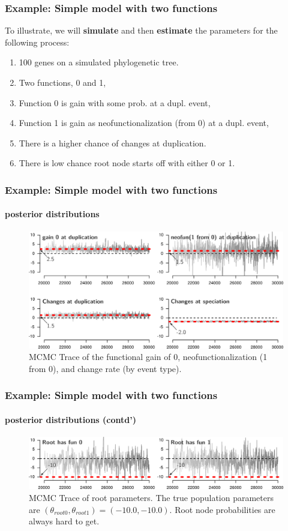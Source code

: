 \documentclass[aspectratio=169, 9pt]{beamer}
\begin{document}
\begin{frame}[c]
	\frametitle{Example: Simple model with two functions}
	To illustrate, we will \textbf{simulate} and then \textbf{estimate} the parameters for the following process:
	\begin{enumerate}
	    \item<2-> 100 genes on a simulated phylogenetic tree.
	    \item<2-> Two functions, 0 and 1,
	    \item<3-> Function 0 is gain with some prob. at a dupl. event,
	    \item<3-> Function 1 is gain as neofunctionalization (from 0) at a dupl. event,
	    \item<4-> There is a higher chance of changes at duplication.
	    \item<4-> There is low chance root node starts off with either 0 or 1.
	\end{enumerate}
	\vfill
\end{frame}


\begin{frame}[c]
	\frametitle{Example: Simple model with two functions}
	\framesubtitle{posterior distributions}
	\begin{figure}
	\includegraphics[width=.8\linewidth]{fig/trace-gain-neo.png}
	\caption{MCMC Trace of the functional gain of 0, neofunctionalization (1 from 0), and change rate (by event type).}
	\end{figure}
\end{frame}


\begin{frame}[c]
	\frametitle{Example: Simple model with two functions}
	\framesubtitle{posterior distributions (contd')}
	\begin{figure}
		\includegraphics[width=.8\linewidth]{fig/trace-root.png}
		\caption{MCMC Trace of root parameters. The true population parameters are $(\theta_{root0}, \theta_{root1}) = (-10.0, -10.0)$. Root node probabilities are always hard to get.}
	\end{figure}
\end{frame}
\end{document}
